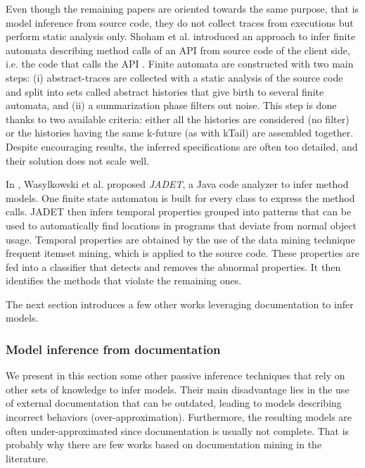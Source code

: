 Even though the remaining papers are oriented towards the same
purpose, that is model inference from source code, they do not
collect traces from executions but perform static analysis only.
Shoham et al. introduced an approach to infer finite automata
describing method calls of an API from source code of the client
side, i.e. the code that calls the API
\cite{Shoham:2007:SSM:1273463.1273487}. Finite automata are
constructed with two main steps: (i) abstract-traces are
collected with a static analysis of the source code and split
into sets called abstract histories that give birth to several
finite automata, and (ii) a summarization phase filters out
noise. This step is done thanks to two available criteria: either
all the histories are considered (no filter) or the histories
having the same k-future (as with kTail) are assembled together.
Despite encouraging results, the inferred specifications are
often too detailed, and their solution does not scale well.

In \cite{Wasylkowski07detectingobject}, Wasylkowski et al.
proposed \textit{JADET}, a Java code analyzer to infer method
models. One finite state automaton is built for every class to
express the method calls. JADET then infers temporal properties
grouped into patterns that can be used to automatically find
locations in programs that deviate from normal object usage.
Temporal properties are obtained by the use of the data mining
technique frequent itemset mining, which is applied to the source
code. These properties are fed into a classifier that detects and
removes the abnormal properties. It then identifies the methods
that violate the remaining ones.

The next section introduces a few other works leveraging
documentation to infer models.

\subsubsection{Model inference from documentation}
\label{sec:passive-others}

We present in this section some other passive inference
techniques that rely on other sets of knowledge to infer models.
Their main disadvantage lies in the use of external documentation
that can be outdated, leading to models describing incorrect
behaviors (over-approximation). Furthermore, the resulting models
are often under-approximated since documentation is usually not
complete. That is probably why there are few works based on
documentation mining in the literature.

